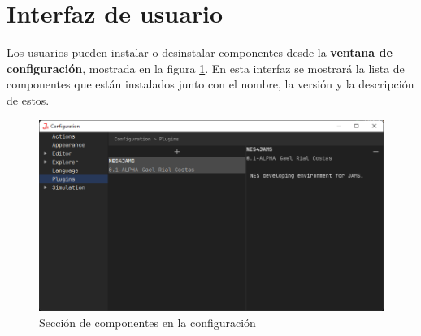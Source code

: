 \section{Interfaz de usuario}\label{sec:interfaz-de-usuario}

Los usuarios pueden instalar o desinstalar componentes
desde la \textbf{ventana de configuración}, mostrada en la figura \ref{fig:plugin-ui}.
En esta interfaz se mostrará la lista de componentes
que están instalados junto con el nombre, la versión
y la descripción de estos.

\begin{figure}[h]
    \centering
    \includegraphics[width=\textwidth]{images/componentes/plugin-ui}
    \caption{Sección de componentes en la configuración}
    \label{fig:plugin-ui}
\end{figure}

